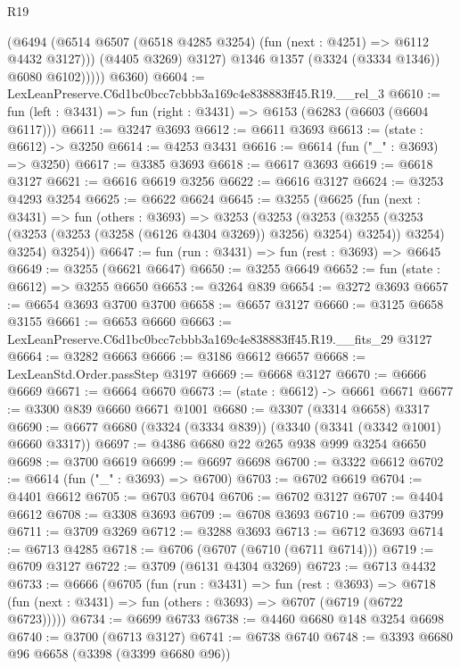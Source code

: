 \begin{lexlean}{R19}
\begin{coremodule}
                  (@6494
                    (@6514 @6507 (@6518 @4285 @3254) (fun (next : @4251) => @6112 @4432 @3127)))
                  (@4405 @3269)
                  @3127)
                @1346
                @1357
                (@3324 (@3334 @1346))
                @6080
                @6102)))))
      @6360)
@6604 := LexLeanPreserve.C6d1bc0bcc7cbbb3a169c4e838883ff45.R19.__rel_3
@6610 := fun (left : @3431) => fun (right : @3431) => @6153 (@6283 (@6603 (@6604 @6117)))
@6611 := @3247 @3693
@6612 := @6611 @3693
@6613 := (state : @6612) -> @3250
@6614 := @4253 @3431
@6616 := @6614 (fun ("_" : @3693) => @3250)
@6617 := @3385 @3693
@6618 := @6617 @3693
@6619 := @6618 @3127
@6621 := @6616 @6619 @3256
@6622 := @6616 @3127
@6624 := @3253 @4293 @3254
@6625 := @6622 @6624
@6645 := @3255
    (@6625
      (fun (next : @3431) =>
      fun (others : @3693) =>
      @3253
        (@3253
          (@3253
            (@3255 (@3253 (@3253 (@3253 (@3258 (@6126 @4304 @3269)) @3256) @3254) @3254))
            @3254)
          @3254)
        @3254))
@6647 := fun (run : @3431) => fun (rest : @3693) => @6645
@6649 := @3255 (@6621 @6647)
@6650 := @3255 @6649
@6652 := fun (state : @6612) => @3255 @6650
@6653 := @3264 @839
@6654 := @3272 @3693
@6657 := @6654 @3693 @3700 @3700
@6658 := @6657 @3127
@6660 := @3125 @6658 @3155
@6661 := @6653 @6660
@6663 := LexLeanPreserve.C6d1bc0bcc7cbbb3a169c4e838883ff45.R19.__fits_29 @3127
@6664 := @3282 @6663
@6666 := @3186 @6612 @6657
@6668 := LexLeanStd.Order.passStep @3197
@6669 := @6668 @3127
@6670 := @6666 @6669
@6671 := @6664 @6670
@6673 := (state : @6612) -> @6661 @6671
@6677 := @3300 @839 @6660 @6671 @1001
@6680 := @3307 (@3314 @6658) @3317
@6690 := @6677 @6680 (@3324 (@3334 @839)) (@3340 (@3341 (@3342 @1001) @6660 @3317))
@6697 := @4386 @6680 @22 @265 @938 @999 @3254 @6650
@6698 := @3700 @6619
@6699 := @6697 @6698
@6700 := @3322 @6612
@6702 := @6614 (fun ("_" : @3693) => @6700)
@6703 := @6702 @6619
@6704 := @4401 @6612
@6705 := @6703 @6704
@6706 := @6702 @3127
@6707 := @4404 @6612
@6708 := @3308 @3693
@6709 := @6708 @3693
@6710 := @6709 @3799
@6711 := @3709 @3269
@6712 := @3288 @3693
@6713 := @6712 @3693
@6714 := @6713 @4285
@6718 := @6706 (@6707 (@6710 (@6711 @6714)))
@6719 := @6709 @3127
@6722 := @3709 (@6131 @4304 @3269)
@6723 := @6713 @4432
@6733 := @6666
    (@6705
      (fun (run : @3431) =>
      fun (rest : @3693) =>
      @6718 (fun (next : @3431) => fun (others : @3693) => @6707 (@6719 (@6722 @6723)))))
@6734 := @6699 @6733
@6738 := @4460 @6680 @148 @3254 @6698
@6740 := @3700 (@6713 @3127)
@6741 := @6738 @6740
@6748 := @3393 @6680 @96 @6658 (@3398 (@3399 @6680 @96))

\end{coremodule}
\end{lexlean}

